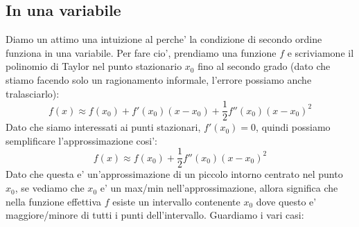 \documentclass{report}
\begin{document}
\subsection{In una variabile}
Diamo un attimo una intuizione al perche' la condizione di secondo ordine funziona in una variabile. Per fare cio', prendiamo una funzione $ f $ e scriviamone il polinomio di Taylor nel punto stazionario $ x_0 $ fino al secondo grado (dato che stiamo facendo solo un ragionamento informale, l'errore possiamo anche tralasciarlo):
\[
   f(x) \approx f(x_0) + f'(x_0)(x-x_0) + \frac{1}{2}f''(x_0)(x-x_0)^2 
\]
Dato che siamo interessati ai punti stazionari, $ f'(x_0) = 0 $, quindi possiamo semplificare l'approssimazione cosi':
\[
  f(x) \approx f(x_0) + \frac{1}{2}f''(x_0)(x-x_0)^2
\]
Dato che questa e' un'approssimazione di un piccolo intorno centrato nel punto $ x_0 $, se vediamo che $ x_0 $ e' un max/min nell'approssimazione, allora significa che nella funzione effettiva $ f $ esiste un intervallo contenente $ x_0 $ dove questo e' maggiore/minore di tutti i punti dell'intervallo. Guardiamo i vari casi:
\end{document}
